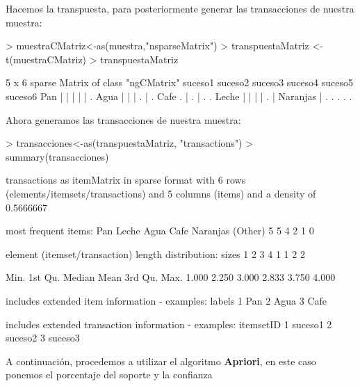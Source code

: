 \documentclass [a4paper] {article}
\begin{document}
Hacemos la transpuesta, para posteriormente generar las transacciones de nuestra muestra:

\begin{Schunk}
\begin{Sinput}
> muestraCMatriz<-as(muestra,"nsparseMatrix")
> transpuestaMatriz <-t(muestraCMatriz)
> transpuestaMatriz
\end{Sinput}
\begin{Soutput}
5 x 6 sparse Matrix of class "ngCMatrix"
         suceso1 suceso2 suceso3 suceso4 suceso5 suceso6
Pan            |       |       |       |       |       .
Agua           |       |       |       .       |       .
Cafe           .       |       .       |       .       .
Leche          |       |       |       |       .       |
Naranjas       |       .       .       .       .       .
\end{Soutput}
\end{Schunk}

Ahora generamos las transacciones de nuestra muestra:

\begin{Schunk}
\begin{Sinput}
> transacciones<-as(transpuestaMatriz, "transactions")
> summary(transacciones)
\end{Sinput}
\begin{Soutput}
transactions as itemMatrix in sparse format with
 6 rows (elements/itemsets/transactions) and
 5 columns (items) and a density of 0.5666667 

most frequent items:
     Pan    Leche     Agua     Cafe Naranjas  (Other) 
       5        5        4        2        1        0 

element (itemset/transaction) length distribution:
sizes
1 2 3 4 
1 1 2 2 

   Min. 1st Qu.  Median    Mean 3rd Qu.    Max. 
  1.000   2.250   3.000   2.833   3.750   4.000 

includes extended item information - examples:
  labels
1    Pan
2   Agua
3   Cafe

includes extended transaction information - examples:
  itemsetID
1   suceso1
2   suceso2
3   suceso3
\end{Soutput}
\end{Schunk}

A continuación, procedemos a utilizar el algoritmo \textbf{Apriori}, en este caso ponemos el porcentaje del soporte
y la confianza
\end{document}

